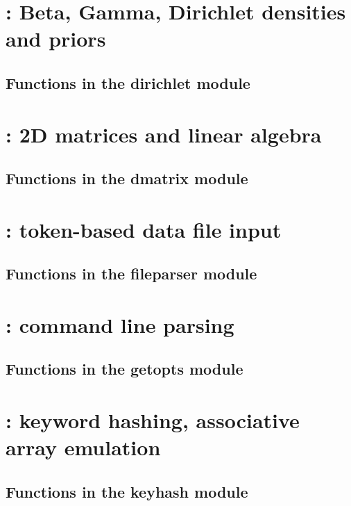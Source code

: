 \documentclass[10pt]{book}
\begin{document}
\newpage
\section{: Beta, Gamma, Dirichlet densities and priors}

\subsection{Functions in the dirichlet module}


\newpage
\section{: 2D matrices and linear algebra}

\subsection{Functions in the dmatrix module}


\newpage
\section{: token-based data file input}

\subsection{Functions in the fileparser module}


\newpage
\section{: command line parsing}

\subsection{Functions in the getopts module}


\newpage
\section{: keyword hashing, associative array emulation}

\subsection{Functions in the keyhash module}

\end{document}
